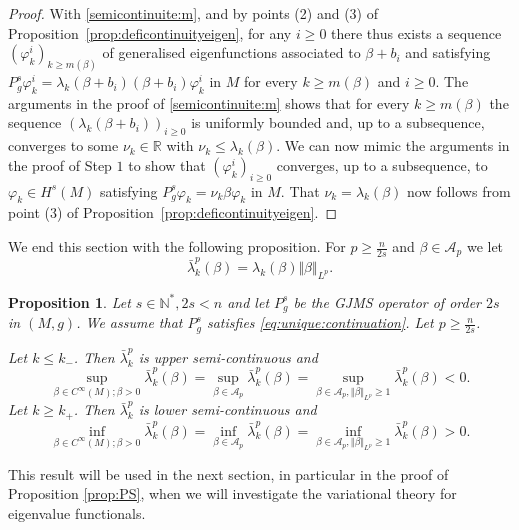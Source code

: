 \documentclass[10pt]{amsart}
\numberwithin{equation}{section}
\newcommand{\R}{\mathbb{R}}
\newcommand{\vp}{\varphi}
\theoremstyle{plain}
\newtheorem{prop}[theo]{Proposition}%
\theoremstyle{remark}
\begin{document}
\begin{proof}
With \eqref{semicontinuite:m}, and by points (2) and (3) of Proposition~\ref{prop:deficontinuityeigen}, for any $i \ge 0$ there thus exists a sequence $(\varphi_k^i)_{k \ge m(\beta)}$ of generalised eigenfunctions associated to $\beta + b_i$ and satisfying $P_g^s \vp_k^i = \lambda_k(\beta + b_i) (\beta + b_i) \vp_k^i$ in $M$ for every $k \ge m(\beta)$ and $i \ge 0$. The arguments in the proof of \eqref{semicontinuite:m} shows that for every $k \ge m(\beta)$ the sequence $(\lambda_k(\beta + b_i))_{i \ge 0}$ is uniformly bounded and, up to a subsequence, converges to some $\nu_k \in \R$ with $\nu_k \le \lambda_k(\beta)$. We can now mimic the arguments in the proof of Step $1$ to show that $( \vp_k^i)_{i \ge0}$ converges, up to a subsequence, to $\vp_k \in H^s(M)$ satisfying $P_g^s \vp_k = \nu_k \beta \vp_k$ in $M$. That $\nu_k = \lambda_k(\beta)$ now follows from point (3) of Proposition~\ref{prop:deficontinuityeigen}.
\end{proof}

We end this section with the following proposition. For $p \ge \frac{n}{2s}$ and $\beta \in \mathcal{A}_p$ we let 
$$ \bar{\lambda}_k^p(\beta) = \lambda_k(\beta) \Vert \beta \Vert_{L^p}. $$

\begin{prop} \label{prop:preliminaryvarset}
Let $s \in \mathbb{N}^*, 2s<n$ and let $P_g^s$ be the GJMS operator of order $2s$ in $(M,g)$. We assume that $P_g^s$ satisfies \eqref{eq:unique:continuation}. Let $p\geq \frac{n}{2s}$. 

Let $k \leq k_-$. Then $\bar{\lambda}_k^p$ is upper semi-continuous and
\begin{equation} \label{eq:supnegativeAp} \sup_{\beta \in C^\infty(M); \beta>0} \bar{\lambda}_k^p(\beta) = \sup_{\beta \in \mathcal{A}_p} \bar{\lambda}_k^p(\beta) = \sup_{\beta \in \mathcal{A}_p , \Vert \beta\Vert_{L^p} \geq 1} \bar{\lambda}_k^p(\beta) < 0. \end{equation}
Let $k \geq k_+$. Then $\bar{\lambda}_k^p$ is lower semi-continuous and
\begin{equation} \label{eq:infpositiveAp} \inf_{\beta \in C^\infty(M); \beta>0} \bar{\lambda}_k^p(\beta) = \inf_{\beta \in \mathcal{A}_p} \bar{\lambda}_k^p(\beta) = \inf_{\beta \in \mathcal{A}_p , \Vert \beta\Vert_{L^p} \geq 1} \bar{\lambda}_k^p(\beta) > 0. \end{equation}
\end{prop}
This result will be used in the next section, in particular in the proof of Proposition \ref{prop:PS}, when we will investigate the variational theory for eigenvalue functionals. 
\end{document}
